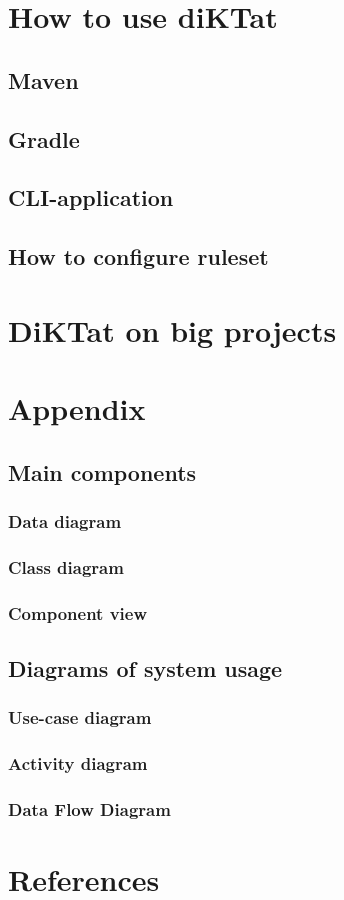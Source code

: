\documentclass{article}
\begin{document}
\section{How to use diKTat}
\subsection{Maven}
\subsection{Gradle}
\subsection{CLI-application}
\subsection{How to configure ruleset}
\newpage

\section{DiKTat on big projects}

\newpage
\section{Appendix}
\subsection{Main components}
\subsubsection{Data diagram}
\subsubsection{Class diagram}
\subsubsection{Component view}

\subsection{Diagrams of system usage}
\subsubsection{Use-case diagram}
\subsubsection{Activity diagram}
\subsubsection{Data Flow Diagram}

\newpage
\section{References}
\end{document}
